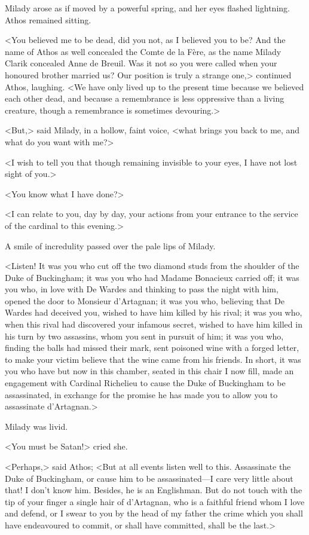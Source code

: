 Milady arose as if moved by a powerful spring, and her eyes flashed lightning. Athos remained sitting. 

<You believed me to be dead, did you not, as I believed you to be? And the name of Athos as well concealed the Comte de la Fère, as the name Milady Clarik concealed Anne de Breuil. Was it not so you were called when your honoured brother married us? Our position is truly a strange one,> continued Athos, laughing. <We have only lived up to the present time because we believed each other dead, and because a remembrance is less oppressive than a living creature, though a remembrance is sometimes devouring.> 

<But,> said Milady, in a hollow, faint voice, <what brings you back to me, and what do you want with me?> 

<I wish to tell you that though remaining invisible to your eyes, I have not lost sight of you.> 

<You know what I have done?> 

<I can relate to you, day by day, your actions from your entrance to the service of the cardinal to this evening.> 

A smile of incredulity passed over the pale lips of Milady. 

<Listen! It was you who cut off the two diamond studs from the shoulder of the Duke of Buckingham; it was you who had Madame Bonacieux carried off; it was you who, in love with De Wardes and thinking to pass the night with him, opened the door to Monsieur d'Artagnan; it was you who, believing that De Wardes had deceived you, wished to have him killed by his rival; it was you who, when this rival had discovered your infamous secret, wished to have him killed in his turn by two assassins, whom you sent in pursuit of him; it was you who, finding the balls had missed their mark, sent poisoned wine with a forged letter, to make your victim believe that the wine came from his friends. In short, it was you who have but now in this chamber, seated in this chair I now fill, made an engagement with Cardinal Richelieu to cause the Duke of Buckingham to be assassinated, in exchange for the promise he has made you to allow you to assassinate d'Artagnan.> 

Milady was livid. 

<You must be Satan!> cried she. 

<Perhaps,> said Athos; <But at all events listen well to this. Assassinate the Duke of Buckingham, or cause him to be assassinated---I care very little about that! I don't know him. Besides, he is an Englishman. But do not touch with the tip of your finger a single hair of d'Artagnan, who is a faithful friend whom I love and defend, or I swear to you by the head of my father the crime which you shall have endeavoured to commit, or shall have committed, shall be the last.> 

